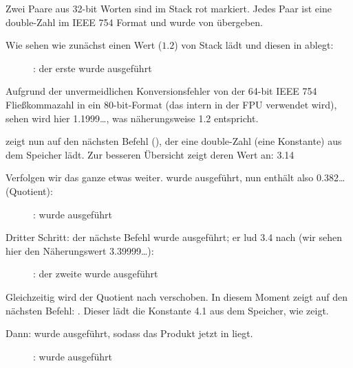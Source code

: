 \clearpage
{}
\myindex{\olly}
Zwei Paare aus 32-bit Worten sind im Stack rot markiert.
Jedes Paar ist eine double-Zahl im IEEE 754 Format und wurde von \main
übergeben.

Wie sehen wie zunächst \FLD einen Wert ($1.2$) von Stack lädt und diesen in
 ablegt:

\begin{figure}[H]
\centering
{}
\caption{\olly: der erste \FLD wurde ausgeführt}
\label{fig:FPU_simple_olly_1}
\end{figure}
Aufgrund der unvermeidlichen Konversionsfehler von der 64-bit IEEE 754
Fließkommazahl in ein 80-bit-Format (das intern in der FPU verwendet wird),
sehen wird hier 1.1999\ldots, was näherungsweise 1.2 entspricht.

\EIP zeigt nun auf den nächsten Befehl (\FDIV), der eine double-Zahl (eine
Konstante) aus dem Speicher lädt. Zur besseren Übersicht zeigt \olly deren Wert
an: 3.14

\clearpage
Verfolgen wir das ganze etwas weiter.
\FDIV wurde ausgeführt, nun enthält  also 0.382\ldots (\gls{Quotient}):

\begin{figure}[H]
\centering
{}
\caption{\olly: \FDIV wurde ausgeführt}
\label{fig:FPU_simple_olly_2}
\end{figure}

\clearpage
Dritter Schritt: der nächste \FLD Befehl wurde ausgeführt; er lud 3.4 nach
 (wir sehen hier den Näherungswert 3.39999\ldots):

\begin{figure}[H]
\centering
{}
\caption{\olly: der zweite \FLD wurde ausgeführt}
\label{fig:FPU_simple_olly_3}
\end{figure}
Gleichzeitig wird der \gls{Quotient} nach  verschoben.
In diesem Moment zeigt \EIP auf den nächsten Befehl: \FMUL.
Dieser lädt die Konstante 4.1 aus dem Speicher, wie \olly zeigt.

\clearpage
Dann: \FMUL wurde ausgeführt, sodass das \gls{Produkt} jetzt in  liegt.

\begin{figure}[H]
\centering
{}
\caption{\olly: \FMUL wurde ausgeführt}
\label{fig:FPU_simple_olly_4}
\end{figure}

